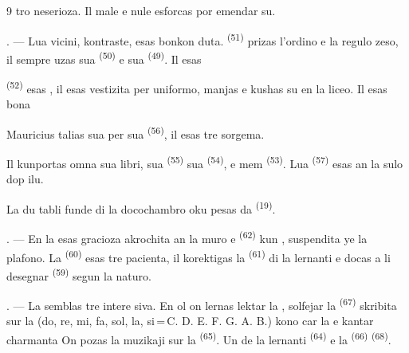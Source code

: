 \begin{VUpage}[11]{9}
\VUcontinue
tro neserioza. Il male  e nule esforcas\nl
por emendar su.

. --- Lua vicini, kontraste, esas bonkon\cc
duta.  \textsuperscript{(51)} prizas l'ordino e la regulo\cc
zeso, il sempre uzas sua  \textsuperscript{(50)} e sua\nl
{} \textsuperscript{(49)}. Il esas 

\VUblancAlinea
{} \textsuperscript{(52)} esas , il esas vestizita\nl
per uniformo, manjas e kushas su en la liceo.\nl
Il esas bona 

\VUblancAlinea
Mauricius talias sua  per sua \cc
{} \textsuperscript{(56)}, il esas tre sorgema.

\VUblancAlinea
Il kunportas omna sua libri, sua \cc
{} \textsuperscript{(55)} sua  \textsuperscript{(54)}, e mem \cc
{} \textsuperscript{(53)}. Lua  \textsuperscript{(57)} esas an la sulo dop\nl
ilu.

\VUblancAlinea
La du tabli funde di la docochambro oku\cc
pesas da  \textsuperscript{(19)}.

\VUsaut{4.6mm}
\VUsaut{3.4mm}

. --- En la  esas gracioza\nl
{} akrochita an la muro e  \textsuperscript{(62)} kun\nl
{}, suspendita ye la plafono. La \cc
{} \textsuperscript{(60)} esas tre pacienta, il korektigas la \cc
{} \textsuperscript{(61)} di la lernanti e docas a li desegnar\nl
{} \textsuperscript{(59)} segun la naturo.

. --- La  semblas tre intere\cc
siva. En ol on lernas lektar la , solfejar\nl
la  \textsuperscript{(67)} skribita sur la  (do, re,\nl
mi, fa, sol, la, si\,=\,C. D. E. F. G. A. B.) kono\cc
car la  e kantar charmanta  On\nl
pozas la muzikaji sur la  \textsuperscript{(65)}. Un de la\nl
lernanti  \textsuperscript{(64)} e la  \textsuperscript{(66)}\nl
{} \textsuperscript{(68)}.
\end{VUpage}

